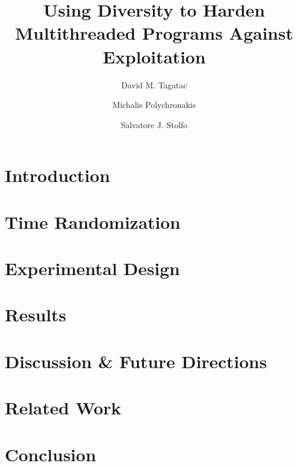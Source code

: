 \documentclass{llncs}
\begin{document}
%
\mainmatter              %
%
\title{Using Diversity to Harden Multithreaded Programs Against Exploitation}
%
\author{
	David M. Tagatac
	\and
	Michalis Polychronakis
	\and
	Salvatore J. Stolfo
}
%

\maketitle              %

\begin{abstract}

\end{abstract}
%
\section{Introduction}


\section{Time Randomization}


\section{Experimental Design}


\section{Results}\label{results}


\section{Discussion \& Future Directions}


\section{Related Work}


\section{Conclusion}



%
%
{\footnotesize 
}
\end{document}
